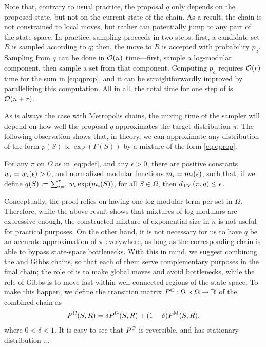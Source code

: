Note that, contrary to usual practice, the proposal $q$ only depends on the proposed state, but not on the current state of the chain.
As a result, the chain is not constrained to local moves, but rather can potentially jump to any part of the state space.
In practice, \Ms{} sampling proceeds in two steps: first, a candidate set $R$ is sampled according to $q$; then, the move to $R$ is accepted with probability $p_a$.
Sampling from $q$ can be done in $\mathcal{O}(n)$ time---first, sample a log-modular component, then sample a set from that component.
Computing $p_a$ requires $\mathcal{O}(r)$ time for the sum in \eqref{eq:qprop}, and it can be straightforwardly improved by parallelizing this computation.
All in all, the total time for one step of \Ms{} is $\mathcal{O}(n + r)$.

As is always the case with Metropolis chains, the mixing time of the \Ms{} sampler will depend on how well the proposal $q$ approximates the target distribution $\pi$.
The following observation shows that, in theory, we can approximate any distribution of the form $p(S) \propto \exp(F(S))$ by a mixture of the form \eqref{eq:qprop}.

\begin{prop} \label{prop:decomp}
  For any $\pi$ on $\Omega$ as in \eqref{eq:pdef}, and any $\epsilon > 0$, there are positive constants $w_i = w_i(\epsilon) > 0$, and normalized modular functions $m_i = m_i(\epsilon)$, such that, if we define $q(S) \vcentcolon= \sum_{i = 1}^r w_i \exp(m_i(S))$, for all $S \in \Omega$, then $d_{\textrm{TV}}\left( \pi, q \right) \leq \epsilon$.
\end{prop}
Conceptually, the proof relies on having one log-modular term per set in $\Omega$.
Therefore, while the above result shows that mixtures of log-modulars are expressive enough, the constructed mixture of exponential size in $n$ is not useful for practical purposes.
On the other hand, it is not necessary for us to have $q$ be an accurate approximation of $\pi$ everywhere, as long as the corresponding \Ms{} chain is able to bypass state-space bottlenecks.
With this in mind, we suggest combining the \Ms{} and Gibbs chains, so that each of them serve complementary purposes in the final chain; the role of \Ms{} is to make global moves and avoid bottlenecks, while the role of Gibbs is to move fast within well-connected regions of the state space.
To make this happen, we define the transition matrix $P^{\mathrm{C}} : \Omega \times \Omega \to \mathbb{R}$ of the combined chain as
\begin{align} \label{eq:cdef}
  P^{\mathrm{C}}(S, R) = \delta P^{\mathrm{G}}(S, R) + (1-\delta)P^{\mathrm{M}}(S, R),
\end{align}
where $0 < \delta < 1$.
It is easy to see that $P^{\mathrm{C}}$ is reversible, and has stationary distribution $\pi$.

